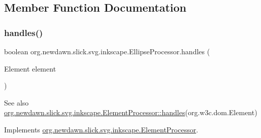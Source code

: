 \subsection{Member Function Documentation}
\mbox{\label{classorg_1_1newdawn_1_1slick_1_1svg_1_1inkscape_1_1_ellipse_processor_a54a6dbcfc6d01e3fd2bc61aeed789c88}} 
\subsubsection{\texorpdfstring{handles()}{handles()}}
{\footnotesize\ttfamily boolean org.\+newdawn.\+slick.\+svg.\+inkscape.\+Ellipse\+Processor.\+handles (\begin{DoxyParamCaption}\item[{Element}]{element }\end{DoxyParamCaption})\hspace{0.3cm}{\ttfamily [inline]}}

\begin{DoxySeeAlso}{See also}
\mbox{\hyperlink{interfaceorg_1_1newdawn_1_1slick_1_1svg_1_1inkscape_1_1_element_processor_ae95bbf21a67c52aff02cf09259c554a3}{org.\+newdawn.\+slick.\+svg.\+inkscape.\+Element\+Processor\+::handles}}(org.\+w3c.\+dom.\+Element) 
\end{DoxySeeAlso}


Implements \mbox{\hyperlink{interfaceorg_1_1newdawn_1_1slick_1_1svg_1_1inkscape_1_1_element_processor_ae95bbf21a67c52aff02cf09259c554a3}{org.\+newdawn.\+slick.\+svg.\+inkscape.\+Element\+Processor}}.


